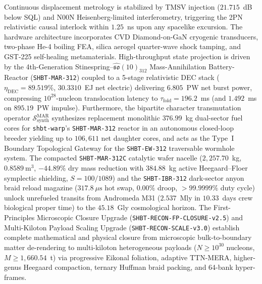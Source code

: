 \documentclass[11pt,onecolumn]{article}
\begin{document}
Continuous displacement metrology is stabilized by TMSV injection ($21.715$~dB below SQL) and N00N Heisenberg-limited interferometry, triggering the 2PN relativistic causal interlock within $1.25$~ns upon any spacelike excursion. The hardware architecture incorporates CVD Diamond-on-GaN cryogenic transducers, two-phase He-4 boiling FEA, silica aerogel quarter-wave shock tamping, and GST-225 self-healing metamaterials. High-throughput state projection is driven by the 4th-Generation Stinespring--$\widehat{\mathfrak{so}}(10)_{312}$ Mass-Annihilation Battery-Reactor (\texttt{SHBT-MAR-312}) coupled to a 5-stage relativistic DEC stack ($\eta_{\text{DEC}} = 89.519\%$, $30.3310$~EJ net electric) delivering $6.805$~PW net burst power, compressing $10^{28}$-nucleon translocation latency to $\tau_{\text{fold}} = 196.2$~ms (and $1.492$~ms on $895.19$~PW impulse). Furthermore, the bipartite character transmutation operator $\mathcal{S}_{\text{synth}}^{\text{MAR}}$ synthesizes replacement monolithic $376.99$~kg dual-sector fuel cores for \texttt{shbt-warp}'s \texttt{SHBT-MAR-312} reactor in an autonomous closed-loop breeder yielding up to $106{,}611$ net daughter cores, and acts as the Type~I Boundary Topological Gateway for the \texttt{SHBT-EW-312} traversable wormhole system. The compacted \texttt{SHBT-MAR-312C} catalytic wafer nacelle ($2{,}257.70$~kg, $0.8589~\mathrm{m}^3$, $-44.89\%$ dry mass reduction with $384.88$~kg active Heegaard--Floer symplectic shielding, $S = 100/1089$) and the \texttt{SHBT-IBR-312} dark-sector anyon braid reload magazine ($317.8~\mu\mathrm{s}$ hot swap, $0.00\%$ droop, $>99.9999\%$ duty cycle) unlock unrefueled transits from Andromeda M31 ($2.537$~Mly in $10.33$~days crew biological proper time) to the $45.18$~Gly cosmological horizon. The First-Principles Microscopic Closure Upgrade (\texttt{SHBT-RECON-FP-CLOSURE-v2.5}) and Multi-Kiloton Payload Scaling Upgrade (\texttt{SHBT-RECON-SCALE-v3.0}) establish complete mathematical and physical closure from microscopic bulk-to-boundary matter de-rendering to multi-kiloton heterogeneous payloads ($N \ge 10^{30}$ nucleons, $M \ge 1{,}660.54$~t) via progressive Eikonal foliation, adaptive TTN-MERA, higher-genus Heegaard compaction, ternary Huffman braid packing, and 64-bank hyper-frames.
\end{document}
